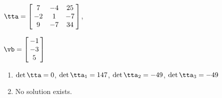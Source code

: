 {$\tta = \left[\hskip -3pt \begin{array}{ccc} 7&-4&25\\  -2&1&-7
\\  9&-7&34\end{array}\hskip -3pt \right]$,

$\vb = \left[\hskip -3pt \begin{array}{c} -1\\  -3\\  
5\end{array}\hskip -3pt \right]$}
{\begin{enumerate}
\item	$\det{\tta} = 0$, $\det{\tta_1} = 147$, $\det{\tta_2} = -49$, $\det{\tta_3} = -49$
\item No solution exists.
\end{enumerate}
}
 


